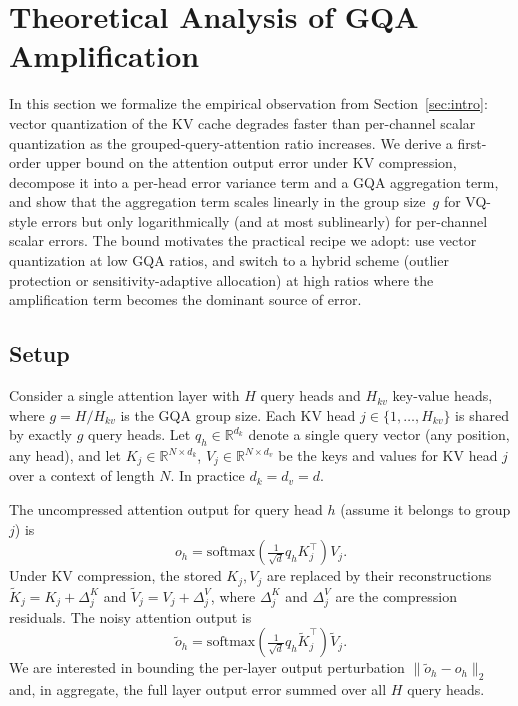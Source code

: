 \section{Theoretical Analysis of GQA Amplification}
\label{sec:theory}

In this section we formalize the empirical observation from
Section~\ref{sec:intro}: vector quantization of the KV cache degrades faster
than per-channel scalar quantization as the grouped-query-attention ratio
increases. We derive a first-order upper bound on the attention output error
under KV compression, decompose it into a per-head error variance term and a
GQA aggregation term, and show that the aggregation term scales linearly in
the group size~$g$ for VQ-style errors but only logarithmically (and at most
sublinearly) for per-channel scalar errors. The bound motivates the practical
recipe we adopt: use vector quantization at low GQA ratios, and switch to a
hybrid scheme (outlier protection or sensitivity-adaptive allocation) at high
ratios where the amplification term becomes the dominant source of error.

\subsection{Setup}
\label{sec:theory-setup}

Consider a single attention layer with $H$ query heads and $H_{kv}$ key-value
heads, where $g = H / H_{kv}$ is the GQA group size. Each KV head $j \in
\{1, \ldots, H_{kv}\}$ is shared by exactly $g$ query heads. Let
$q_h \in \mathbb{R}^{d_k}$ denote a single query vector (any position, any
head), and let $K_j \in \mathbb{R}^{N \times d_k}$, $V_j \in \mathbb{R}^{N
\times d_v}$ be the keys and values for KV head $j$ over a context of length
$N$. In practice $d_k = d_v = d$.

The uncompressed attention output for query head $h$ (assume it belongs to
group $j$) is
\begin{equation}
\label{eq:attn-clean}
o_h = \mathrm{softmax}\!\left( \tfrac{1}{\sqrt{d}} q_h K_j^\top \right) V_j.
\end{equation}
Under KV compression, the stored $K_j, V_j$ are replaced by their
reconstructions $\tilde K_j = K_j + \Delta^K_j$ and
$\tilde V_j = V_j + \Delta^V_j$, where $\Delta^K_j$ and $\Delta^V_j$ are the
compression residuals.  The noisy attention output is
\begin{equation}
\label{eq:attn-noisy}
\tilde o_h = \mathrm{softmax}\!\left( \tfrac{1}{\sqrt{d}} q_h \tilde K_j^\top \right) \tilde V_j.
\end{equation}
We are interested in bounding the per-layer output perturbation
$\|\tilde o_h - o_h\|_2$ and, in aggregate, the full layer output error
summed over all $H$ query heads.

